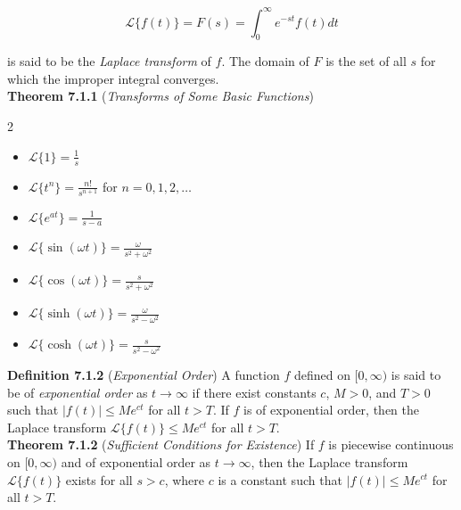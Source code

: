 \documentclass[12pt]{article}
\begin{document}
\begin{equation}
    \mathcal{L} \{f(t)\} = F(s) = \int_0^\infty e^{-st} f(t) dt
\end{equation}

\noindent is said to be the \emph{Laplace transform} of \(f\). The domain of \(F\) is the set of all \(s\) for which the improper integral converges. \\

\noindent\textbf{Theorem 7.1.1} (\emph{Transforms of Some Basic Functions})

\begin{multicols}{2}
    \begin{itemize}
        \item [(a)] \(\displaystyle\mathcal{L} \{1\} = \frac{1}{s}\)
        \item [(b)] \(\displaystyle\mathcal{L} \{t^n\} = \frac{n!}{s^{n+1}}\) for \(n = 0, 1, 2, \ldots\)
        \item [(c)] \(\displaystyle\mathcal{L} \{e^{at}\} = \frac{1}{s-a}\)
        \item [(d)] \(\displaystyle\mathcal{L} \{\sin(\omega t)\} = \frac{\omega}{s^2 + \omega^2}\)
        \item [(e)] \(\displaystyle\mathcal{L} \{\cos(\omega t)\} = \frac{s}{s^2 + \omega^2}\)
        \item [(f)] \(\displaystyle\mathcal{L} \{\sinh(\omega t)\} = \frac{\omega}{s^2 - \omega^2}\)
        \item [(g)] \(\displaystyle\mathcal{L} \{\cosh(\omega t)\} = \frac{s}{s^2 - \omega^2}\)
    \end{itemize}
\end{multicols}

\noindent\textbf{Definition 7.1.2} (\emph{Exponential Order}) A function \(f\) defined on \([0, \infty)\) is said to be of \emph{exponential order} as \(t\to\infty\) if there exist constants \(c\), \(M > 0\), and \(T > 0\) such that \(\vert f(t) \vert \leq M e^{ct}\) for all \(t > T\). If \(f\) is of exponential order, then the Laplace transform \(\mathcal{L} \{f(t)\} \leq Me^{ct}\) for all \(t > T\).\\

\noindent\textbf{Theorem 7.1.2} (\emph{Sufficient Conditions for Existence}) If \(f\) is piecewise continuous on \([0, \infty)\) and of exponential order as \(t \to \infty\), then the Laplace transform \(\mathcal{L} \{f(t)\}\) exists for all \(s > c\), where \(c\) is a constant such that \(\vert f(t) \vert \leq Me^{ct}\) for all \(t > T\).\\
\end{document}
